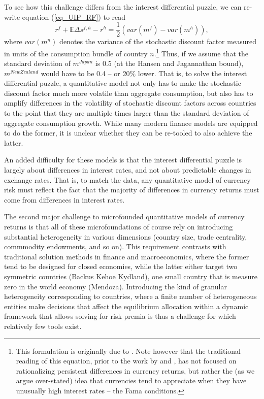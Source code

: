 \documentclass{ar-1col}
\begin{document}
To see how this challenge differs from the interest differential puzzle, we can re-write equation (\ref{eq_UIP_RF}) to read \begin{equation}
  r^{f} +\mathbb{E} \Delta  s^{f,h} - r^{h} =\frac{1}{2}\left(var(m^f)-var(m^h)\right),
\end{equation} where $var(m^n)$ denotes the variance of the stochastic discount factor measured in units of the consumption bundle of country $n$.\footnote{This formulation is originally due to 
\cite{Backusetal2001}. Note however that the traditional reading of this equation, prior to the work by \cite{LustigRoussanovVerdelhan2011} and \cite{HassanMano2019}, has not focused on rationalizing persistent differences in currency returns, but rather the (as we argue over-stated) idea that currencies tend to appreciate when they have unusually high interest rates -- the Fama conditions.} Thus, if we assume that the standard deviation of $m^{Japan}$ is 0.5 (at the Hansen and Jagannathan bound), $m^{New Zealand}$ would have to be 0.4 -- or 20\% lower. That is, to solve the interest differential puzzle, a quantitative model not only has to make the stochastic discount factor much more volatile than aggregate consumption, but also has to amplify differences in the volatility of stochastic discount factors across countries to the point that they are multiple times larger than the standard deviation of aggregate consumption growth. While many modern finance models are equipped to do the former, it is unclear whether they can be re-tooled to also achieve the latter. 

An added difficulty for these models is that the interest differential puzzle is largely about differences in interest rates, and not about predictable changes in exchange rates. That is, to match the data, any quantitative model of currency risk must reflect the fact that the majority of differences in currency returns must come from differences in interest rates. 

The second major challenge to microfounded quantitative models of currency returns is that all of these microfoundations of course rely on introducing substantial heterogeneity in various dimensions (country size, trade centrality, commmodity endowments, and so on). This requirement contrasts with traditional solution methods in finance and macroeconomics, where the former tend to be designed for closed economies, while the latter either target two symmetric countries (Backus Kehoe Kydland), one small country that is measure zero in the world economy (Mendoza). Introducing the kind of granular heterogeneity corresponding to countries, where a finite number of heterogeneous entities make decisions that affect the equilibrium allocation within a dynamic framework that allows solving for risk premia is thus a challenge for which relatively few tools exist. 
\end{document}
